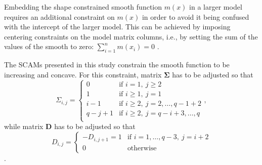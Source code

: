 Embedding the shape constrained smooth function \(m(x)\) in a larger model requires an additional constraint on \(m(x)\) in order to avoid it being confused with the intercept of the larger model.  This can be achieved by imposing centering constraints on the model matrix columns, i.e., by setting the sum of the values of the smooth to zero: \(\sum_{i = 1}^n m(x_i) = 0\) \parencite{Pya2015}.

The SCAMs presented in this study constrain the smooth function to be increasing and concave.  For this constraint, matrix \(\symbf{\Sigma}\) has to be adjusted so that
\begin{equation}
  \label{eq:SCAMSigmaIncreasingConcave}
  \Sigma_{i, j} =
  \begin{cases}
    0 &\text{if } i = 1,~ j \geq 2 \\
    1 &\text{if } i \geq 1,~ j = 1 \\
    i - 1 &\text{if } i \geq 2,~ j = 2, \ldots, q - 1 + 2 \\
    q - j + 1 &\text{if } i \geq 2,~ j = q - i + 3, \ldots, q\\
  \end{cases},
\end{equation}
while matrix \(\symbf{D}\) has to be adjusted so that
\begin{equation}
  \label{eq:SCAMDIncreasingConcave}
  D_{i, j} = 
  \begin{cases}
    - D_{i, j + 1} = 1 &\text{if } i = 1, \ldots, q - 3,~ j = i + 2 \\
    0 &\text{otherwise}
  \end{cases}
\end{equation}
\parencite{Pya2015}.

